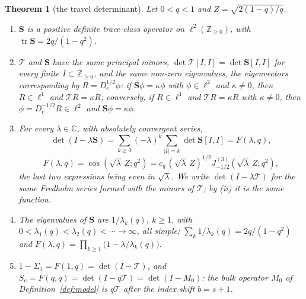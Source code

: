 \documentclass[11pt]{article}
\theoremstyle{plain}
\newtheorem{theorem}{Theorem}
\theoremstyle{definition}
\theoremstyle{remark}
\newcommand{\Z}{\mathbb{Z}}
\newcommand{\C}{\mathbb{C}}
\begin{document}
\begin{theorem}[the travel determinant]\label{thm:fredholm}
Let $0<q<1$ and $Z=\sqrt{2(1-q)/q}$.
\begin{enumerate}[label=\textup{(\roman*)},leftmargin=2.2em,itemsep=0.1em,topsep=0.2em]
\item $\mathbf S$ is a positive definite trace-class operator on $\ell^2(\Z_{\ge0})$, with
$\operatorname{tr}\mathbf S=2q/(1-q^2)$.
\item $\mathcal T$ and $\mathbf S$ have the same principal minors,
$\det\mathcal T[I,I]=\det\mathbf S[I,I]$ for every finite $I\subset\Z_{\ge0}$, and the same non-zero
eigenvalues, the eigenvectors corresponding by $R=D_e^{1/2}\phi$: if $\mathbf S\phi=\kappa\phi$ with
$\phi\in\ell^2$ and $\kappa\ne0$, then $R\in\ell^1$ and $\mathcal TR=\kappa R$; conversely, if
$R\in\ell^1$ and $\mathcal TR=\kappa R$ with $\kappa\ne0$, then $\phi=D_e^{-1/2}R\in\ell^2$ and
$\mathbf S\phi=\kappa\phi$.
\item For every $\lambda\in\C$, with absolutely convergent series,
\[
   \det(I-\lambda\mathbf S)=\sum_{k\ge0}(-\lambda)^k\!\!\sum_{|I|=k}\det\mathbf S[I,I]
   =F(\lambda,q),
\]
\[
   F(\lambda,q)=\cos(\sqrt\lambda\,Z;q^2)
   =c_q\,(\sqrt\lambda\,Z)^{1/2}J^{(3)}_{-1/2}(\sqrt\lambda\,Z;q^2),
\]
the last two expressions being even in $\sqrt\lambda$. We write $\det(I-\lambda\mathcal T)$ for the
same Fredholm series formed with the minors of $\mathcal T$; by \textup{(ii)} it is the same
function.
\item The eigenvalues of $\mathbf S$ are $1/\lambda_k(q)$, $k\ge1$, with
$0<\lambda_1(q)<\lambda_2(q)<\cdots\to\infty$, all simple; $\sum_k1/\lambda_k(q)=2q/(1-q^2)$ and
$F(\lambda,q)=\prod_{k\ge1}\bigl(1-\lambda/\lambda_k(q)\bigr)$.
\item $1-\Sigma_1=F(1,q)=\det(I-\mathcal T)$, and $S_e=F(q,q)=\det(I-q\mathcal T)=\det(I-M_0)$: the
bulk operator $M_0$ of Definition~\ref{def:model} is $q\mathcal T$ after the index shift $b=s+1$.
\end{enumerate}
\end{theorem}
\end{document}
